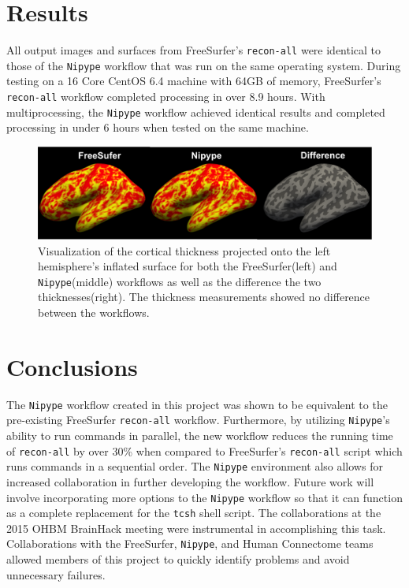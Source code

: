 \documentclass[twocolumn]{bmcart}%
\begin{document}
\section{Results}\label{results}

All output images and surfaces from FreeSurfer's \texttt{recon-all} were identical to those of the \texttt{Nipype} workflow that was run on the same operating system.
During testing on a 16 Core CentOS 6.4 machine with 64GB of memory, FreeSurfer's \texttt{recon-all} workflow completed processing in over 8.9 hours. With multiprocessing, the \texttt{Nipype} workflow achieved identical results and completed processing in under 6 hours when tested on the same machine.

\begin{figure}[h]
\centering
\includegraphics[width=.45\textwidth]{FS6NipypeDiff.png}
\caption{Visualization of the cortical thickness projected onto the left hemisphere's inflated surface for both the FreeSurfer(left) and \texttt{Nipype}(middle) workflows as well as the difference the two thicknesses(right). The thickness measurements showed no difference between the workflows.}
\end{figure}
%
%

\section{Conclusions}\label{conclusions}

The \texttt{Nipype} workflow created in this project was shown to be equivalent to the pre-existing FreeSurfer \texttt{recon-all} workflow.
Furthermore, by utilizing \texttt{Nipype}'s ability to run commands in parallel, the new workflow reduces the running time of \texttt{recon-all} by over 30\% when compared to FreeSurfer's \texttt{recon-all} script which runs commands in a sequential order. The \texttt{Nipype} environment also allows for increased collaboration in further developing the workflow.
Future work will involve incorporating more options to the \texttt{Nipype} workflow so that it can function as a complete replacement for the \texttt{tcsh} shell script.
The collaborations at the 2015 OHBM BrainHack meeting were instrumental in accomplishing this task.
Collaborations with the FreeSurfer, \texttt{Nipype}, and Human Connectome teams allowed members of this project to quickly identify problems and avoid unnecessary failures.
\end{document}
